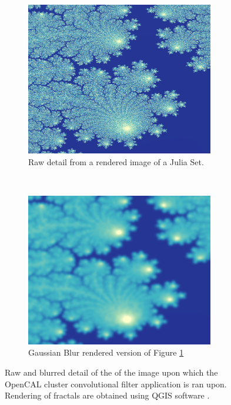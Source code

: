 \begin{figure}[!t]
	\begin{subfigure}[t]{0.5\textwidth}
		\centering
		\includegraphics[width=0.9\textwidth]{./images/opencal/frattale0_detail}
		\caption{Raw detail from a rendered image of a Julia Set.}
			\label{fig:fractal_detail_raw}
	\end{subfigure}%
~
	\begin{subfigure}[t]{0.5\textwidth}
		\centering
		\includegraphics[width=0.9\textwidth]{./images/opencal/frattale1_blur_100_detail}
		\caption{Gaussian Blur rendered version of Figure \ref{fig:fractal_detail_raw}}
				\label{fig:fractal_detail_blur}
	\end{subfigure}
\caption{Raw and blurred detail of the of the image upon which the OpenCAL cluster convolutional filter application is ran upon. Rendering of fractals are obtained using QGIS software \cite{QGIS_software}.}
\label{fig:fractal_detail}
\end{figure}


